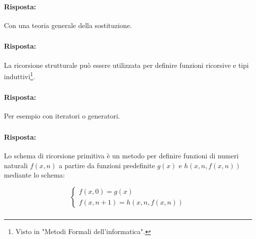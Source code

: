 \paragraph{Risposta:} Con una teoria generale della sostituzione.

\subsubsection{}


\paragraph{Risposta:} La ricorsione strutturale può essere utilizzata per definire funzioni ricorsive e tipi induttivi\footnote{Visto in "Metodi Formali dell'informatica".}.

\subsubsection{}


\paragraph{Risposta:} Per esempio con iteratori o generatori.

\subsubsection{}


\paragraph{Risposta:} Lo schema di ricorsione primitiva è un metodo per definire funzioni di numeri 
naturali $f(x, n)$ a partire da funzioni predefinite $g(x)$ e $h(x, n, f(x, n))$ mediante lo schema:

$$
\begin{cases}
    f(x, 0) = g(x) \\
    f(x, n+1) = h(x, n, f(x, n))
\end{cases}
$$

\subsubsection{}

